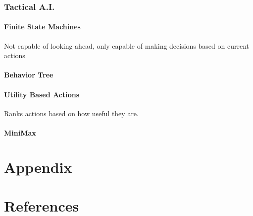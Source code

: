 \documentclass[12pt,a4paper]{report}
\begin{document}
		\subsection{Tactical A.I.}
		\subsubsection{Finite State Machines}
			Not capable of looking ahead, only capable of making decisions based on current actions
		\subsubsection{Behavior Tree}
		\subsubsection{Utility Based Actions}
			Ranks actions based on how useful they are.
		\subsubsection{MiniMax}

\newpage
\chapter*{Appendix}

\newpage
{}
\listoffigures

\newpage
{}
\listoftables

\newpage
\chapter*{References}
	
\end{document}

